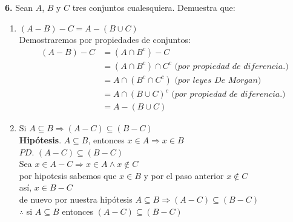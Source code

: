 \documentclass[12pt]{article}
\begin{document}
%
%
\textbf{6.} Sean $A$, $B$ y $C$ tres conjuntos cualesquiera. Demuestra que:
\begin{enumerate}[label=\alph*)]
    \item $(A - B) - C = A - (B \cup C)$\\
    Demostraremos por propiedades de conjuntos:
    \begin{align*}
        (A - B) - C &= (A \cap B^c) - C\\
        &= (A \cap B^c) \cap C^c \textit{ (por propiedad de diferencia.)}\\
        &= A \cap (B^c \cap C^c) \textit{ (por leyes De Morgan)}\\
        &= A \cap (B \cup C)^c \textit{ (por propiedad de diferencia.)}\\
        &= A - (B \cup C)
    \end{align*}

    \item Si $A \subseteq B \Longrightarrow (A - C) \subseteq (B - C)$\\

    \textbf{Hipótesis}. $A \subseteq B$, entonces $x \in A \Longrightarrow x \in B$\\
    
    $PD$. $(A - C) \subseteq (B - C)$\\
    Sea $x \in A - C \Longrightarrow x \in A \land x \notin C$\\
    por hipotesis sabemos que $x \in B$ y por el paso anterior $x \notin C$\\
    así, $x \in B - C$\\
    de nuevo por nuestra hipótesis $A \subseteq B \Longrightarrow (A - C) \subseteq (B - C)$\\
    $\therefore$ si $A \subseteq B$ entonces $(A - C) \subseteq (B - C)$

\end{enumerate}
\end{document}
